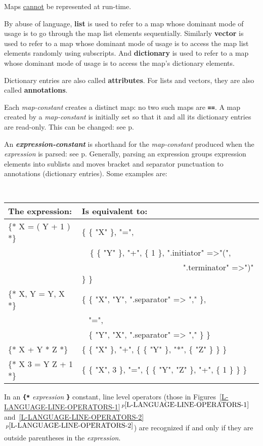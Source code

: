 \documentclass[12pt]{article}
\newcommand{\TT}[1]{{\tt \bfseries #1}}
\newcommand{\key}[1]{{\rm \bfseries #1}}
\newcommand{\emkey}[1]{{\em \bfseries #1}}
\newcommand{\skey}[2]{{\rm \bfseries #1#2}}
\newcommand{\itemref}[1]{\ref{#1}$\,^{p\pageref{#1}}$}
\newcommand{\pagref}[1]{p\pageref{#1}}
\begin{document}
Maps \underline{cannot} be represented at run-time.

By abuse of language, \key{list} is used to refer to a map whose
dominant mode of usage is to go through the map list elements
sequentially.  Similarly \key{vector} is used to refer to a map whose
dominant mode of usage is to access the map list elements randomly
using subscripts.  And \key{dictionary} is used to refer to a map
whose dominant mode of usage is to access the map's dictionary elements.

Dictionary entries are also called \skey{attribute}s.  For lists and
vectors, they are also called \skey{annotation}s.

Each {\em map-constant}
creates a distinct map: no two such maps are \TT{==}.  A map created
by a {\em map-constant} is initially set so that it and all its dictionary
entries are read-only.  This can be changed: see \pagref{READ-ONLY-MAP}.

An \emkey{expression-constant}\label{EXPRESSION-CONSTANT}
is shorthand for the {\em map-constant}
produced when the {\em expression} is parsed: see \pagref{PARSER-OUTPUT}.
Generally, parsing an expression groups expression elements into
sublists and moves bracket and separator punctuation to annotations
(dictionary entries).  Some examples are:
\begin{center} \tt
\begin{tabular}{l@{~~~}l}
\rm The expression:	& \rm Is equivalent to:
\\\hline
\{* X = ( Y + 1 ) *\}	& \{ \{ "X" \}, "=", \\
			&  ~~\{ \{ "Y" \}, "+", \{ 1 \}, ".initiator" =>"(", \\
			& ~~~~~~~~~~~~~~~~~~~~~~~~~".terminator" =>")" \} \}
\\[0.5ex]
\{* X, Y = Y, X *\}	& \{ \{ "X", "Y", ".separator" => "," \}, \\
			&  ~ "=", \\
			&  ~ \{ "Y", "X", ".separator" => "," \} \}
\\[0.5ex]
\{* X + Y * Z *\}	& \{ \{ "X" \}, "+", \{ \{ "Y" \}, "*", \{ "Z" \} \} \}
\\[0.5ex]
\{* X 3 = Y Z + 1 *\}	& \{ \{ "X", 3 \}, "=",
                             \{ \{ "Y", "Z" \}, "+", \{ 1 \} \} \}
\end{tabular}
\end{center}
In an \TT{\{*} {\em expression} \TT{*\}} constant,
line level operators (those in
Figures~\itemref{L-LANGUAGE-LINE-OPERATORS-1}
and~\itemref{L-LANGUAGE-LINE-OPERATORS-2})
are recognized if and only if
they are outside parentheses in the {\em expression}.
\end{document}
